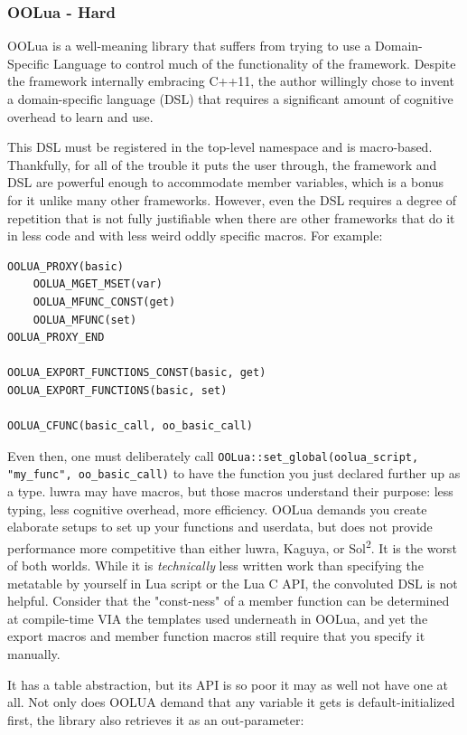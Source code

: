 \documentclass[conference,compsoc]{IEEEtran}
\newcommand{\soltwo}{Sol\textsuperscript{2}}
\begin{document}
\subsubsection{OOLua - Hard}

OOLua\cite{oolua} is a well-meaning library that suffers from trying to use a Domain-Specific Language to control much of the functionality of the framework. Despite the framework internally embracing C++11, the author willingly chose to invent a domain-specific language (DSL) that requires a significant amount of cognitive overhead to learn and use.

This DSL must be registered in the top-level namespace and is macro-based. Thankfully, for all of the trouble it puts the user through, the framework and DSL are powerful enough to accommodate member variables, which is a bonus for it unlike many other frameworks. However, even the DSL requires a degree of repetition that is not fully justifiable when there are other frameworks that do it in less code and with less weird oddly specific macros. For example:

\begin{lstlisting}[caption={Macros to setup usertype bindings and a function binding in OOLua}, label={lst:oolua-dsl}]
OOLUA_PROXY(basic)
	OOLUA_MGET_MSET(var)
	OOLUA_MFUNC_CONST(get)
	OOLUA_MFUNC(set)
OOLUA_PROXY_END

OOLUA_EXPORT_FUNCTIONS_CONST(basic, get)
OOLUA_EXPORT_FUNCTIONS(basic, set)

OOLUA_CFUNC(basic_call, oo_basic_call)
\end{lstlisting}

Even then, one must deliberately call \lstinline|OOLua::set_global(oolua_script, "my_func", oo_basic_call)| to have the function you just declared further up as a type. luwra may have macros, but those macros understand their purpose: less typing, less cognitive overhead, more efficiency. OOLua demands you create elaborate setups to set up your functions and userdata, but does not provide performance more competitive than either luwra, Kaguya, or \soltwo{}. It is the worst of both worlds. While it is \emph{technically} less written work than specifying the metatable by yourself in Lua script or the Lua C API, the convoluted DSL is not helpful. Consider that the "const-ness" of a member function can be determined at compile-time VIA the templates used underneath in OOLua, and yet the export macros and member function macros still require that you specify it manually.

It has a table abstraction, but its API is so poor it may as well not have one at all. Not only does OOLUA demand that any variable it gets is default-initialized first, the library also retrieves it as an out-parameter:
\end{document}

